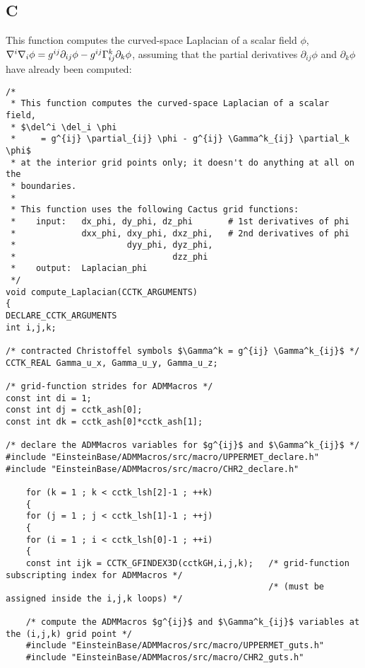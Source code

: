 \subsection{C}

This function computes the curved-space Laplacian of a scalar field $\phi$,
$\nabla^i \nabla_i \phi
	= g^{ij} \partial_{ij} \phi - g^{ij} \Gamma^k_{ij} \partial_k \phi$,
assuming that the partial derivatives $\partial_{ij} \phi$ and $\partial_k \phi$
have already been computed:

\newpage	%
\begingroup
\footnotesize
\begin{verbatim}
/*
 * This function computes the curved-space Laplacian of a scalar field,
 * $\del^i \del_i \phi
 *     = g^{ij} \partial_{ij} \phi - g^{ij} \Gamma^k_{ij} \partial_k \phi$
 * at the interior grid points only; it doesn't do anything at all on the
 * boundaries.
 *
 * This function uses the following Cactus grid functions:
 *    input:   dx_phi, dy_phi, dz_phi       # 1st derivatives of phi
 *             dxx_phi, dxy_phi, dxz_phi,   # 2nd derivatives of phi
 *                      dyy_phi, dyz_phi,
 *                               dzz_phi
 *    output:  Laplacian_phi
 */
void compute_Laplacian(CCTK_ARGUMENTS)
{
DECLARE_CCTK_ARGUMENTS
int i,j,k;

/* contracted Christoffel symbols $\Gamma^k = g^{ij} \Gamma^k_{ij}$ */
CCTK_REAL Gamma_u_x, Gamma_u_y, Gamma_u_z;

/* grid-function strides for ADMMacros */
const int di = 1;
const int dj = cctk_ash[0];
const int dk = cctk_ash[0]*cctk_ash[1];

/* declare the ADMMacros variables for $g^{ij}$ and $\Gamma^k_{ij}$ */
#include "EinsteinBase/ADMMacros/src/macro/UPPERMET_declare.h"
#include "EinsteinBase/ADMMacros/src/macro/CHR2_declare.h"

    for (k = 1 ; k < cctk_lsh[2]-1 ; ++k)
    {
    for (j = 1 ; j < cctk_lsh[1]-1 ; ++j)
    {
    for (i = 1 ; i < cctk_lsh[0]-1 ; ++i)
    {
    const int ijk = CCTK_GFINDEX3D(cctkGH,i,j,k);   /* grid-function subscripting index for ADMMacros */
                                                    /* (must be assigned inside the i,j,k loops) */

    /* compute the ADMMacros $g^{ij}$ and $\Gamma^k_{ij}$ variables at the (i,j,k) grid point */
    #include "EinsteinBase/ADMMacros/src/macro/UPPERMET_guts.h"
    #include "EinsteinBase/ADMMacros/src/macro/CHR2_guts.h"


\end{verbatim}

